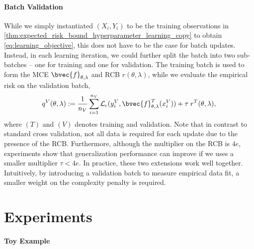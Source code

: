 \documentclass{llncs}
\begin{document}
	\paragraph{Batch Validation} While we simply instantiated $(X_{i}, Y_{i})$ to be the training observations in \cref{thm:expected_risk_bound_hyperparameter_learning_copy} to obtain \eqref{eq:learning_objective}, this does not have to be the case for batch updates. Instead, in each learning iteration, we could further split the batch into two sub-batches -- one for training and one for validation. The training batch is used to form the \gls{MCE} $\bvec{f}_{\theta, \lambda}$ and \gls{RCB} $r(\theta, \lambda)$, while we evaluate the empirical risk on the validation batch,
	\begin{equation}
	q^{V}(\theta, \lambda) := \frac{1}{n_{V}} \sum_{i = 1}^{n_{V}} \mathcal{L}_{\epsilon}(y^{V}_{i}, \bvec{f}^{T}_{\theta, \lambda}(x^{V}_{i})) + \tau \; r^{T}(\theta, \lambda),
	\label{eq:validation_learning_objective}
	\end{equation}
	where $(T)$ and $(V)$ denotes training and validation. Note that in contrast to standard cross validation, not all data is required for each update due to the presence of the \gls{RCB}. Furthermore, although the multiplier on the \gls{RCB} is $4 e$, experiments show that generalization performance can improve if we uses a smaller multiplier $\tau < 4 e$. In practice, these two extensions work well together. Intuitively, by introducing a validation batch to measure empirical data fit, a smaller weight on the complexity penalty is required. 
	
	\section{Experiments}
	\label{sec:experiments}
	
	\paragraph{Toy Example}
	
\end{document}
